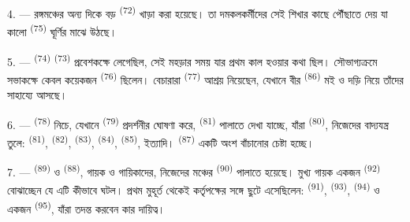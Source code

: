 4. --- রঙ্গমঞ্চের অন্য দিকে বড়  \textsuperscript{(72)} খাড়া করা
হয়েছে। তা দমকলকর্মীদের সেই শিখার কাছে পৌঁছাতে দেয় যা কালো 
\textsuperscript{(75)} ঘূর্ণির মাঝে উঠছে।

\VUsaut{5.0mm}
\VUsaut{3.4mm}

5. ---  \textsuperscript{(74)} 
\textsuperscript{(73)} প্রবেশকক্ষে লেগেছিল, সেই  মহড়ার সময় যার
প্রথম  কাল হওয়ার কথা ছিল। সৌভাগ্যক্রমে সভাকক্ষে কেবল কয়েকজন
 \textsuperscript{(76)} ছিলেন। বেচারারা 
\textsuperscript{(77)} আশ্রয় নিয়েছেন, যেখানে বীর 
\textsuperscript{(86)} মই ও দড়ি নিয়ে তাঁদের সাহায্যে আসছে।

6. ---  \textsuperscript{(78)} নিচে, যেখানে 
\textsuperscript{(79)} প্রদর্শনীর ঘোষণা করে, 
\textsuperscript{(81)} পালাতে দেখা যাচ্ছে, যাঁরা 
\textsuperscript{(80)}, নিজেদের বাদ্যযন্ত্র তুলে: 
\textsuperscript{(81)},  \textsuperscript{(82)}, 
\textsuperscript{(83)},  \textsuperscript{(84)}, 
\textsuperscript{(85)}, ইত্যাদি।  \textsuperscript{(87)} একটি অংশ
বাঁচানোর চেষ্টা হচ্ছে।

7. ---  \textsuperscript{(89)} ও 
\textsuperscript{(88)}, গায়ক ও গায়িকাদের, নিজেদের মঞ্চের 
\textsuperscript{(90)} পালাতে হয়েছে। মুখ্য গায়ক একজন 
\textsuperscript{(92)} বোঝাচ্ছেন যে এটি কীভাবে ঘটল।  প্রথম
মুহূর্ত থেকেই কর্তৃপক্ষের সঙ্গে ছুটে এসেছিলেন: 
\textsuperscript{(91)},  \textsuperscript{(93)},  \textsuperscript{(94)} ও একজন  \textsuperscript{(95)},
যাঁরা তদন্ত করবেন কার দায়িত্ব।
\VUsaut{6.0mm}
\VUfilet{22mm}
